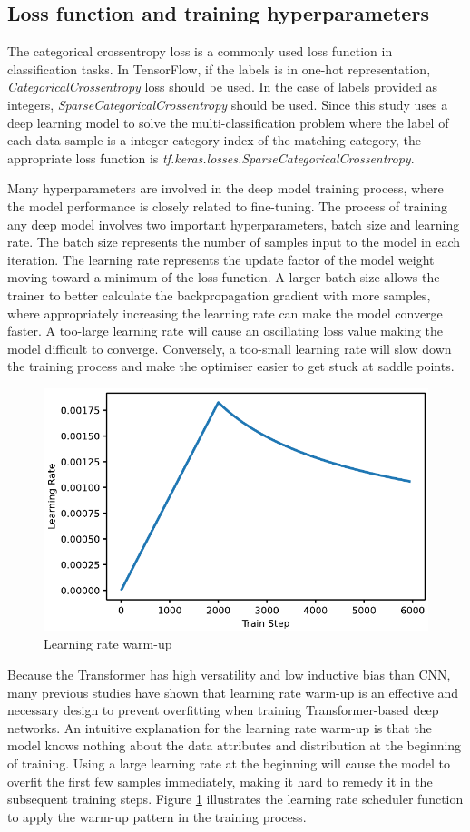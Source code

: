 \subsection{Loss function and training hyperparameters}
The categorical crossentropy loss is a commonly used loss function in classification tasks.
In TensorFlow, if the labels is in one-hot representation, \textit{CategoricalCrossentropy} loss should be used.
In the case of labels provided as integers, \textit{SparseCategoricalCrossentropy} should be used.
Since this study uses a deep learning model to solve the multi-classification problem where the label of each data sample is a integer category index of the matching category, the appropriate loss function is \textit{tf.keras.losses.SparseCategoricalCrossentropy}.

Many hyperparameters are involved in the deep model training process, where the model performance is closely related to fine-tuning.
The process of training any deep model involves two important hyperparameters, batch size and learning rate.
The batch size represents the number of samples input to the model in each iteration.
The learning rate represents the update factor of the model weight moving toward a minimum of the loss function.
A larger batch size allows the trainer to better calculate the backpropagation gradient with more samples, where appropriately increasing the learning rate can make the model converge faster.
A too-large learning rate will cause an oscillating loss value making the model difficult to converge.
Conversely, a too-small learning rate will slow down the training process and make the optimiser easier to get stuck at saddle points.

\begin{figure}
    \vspace*{-1.2em}
    \centering
    \includegraphics[width=.6\textwidth]{design/imgs/3-lr-warmup.pdf}
    \caption{Learning rate warm-up}
    \label{fig:3-lr-warmup}
\end{figure}

Because the Transformer has high versatility and low inductive bias than CNN, many previous studies have shown that learning rate warm-up is an effective and necessary design to prevent overfitting when training Transformer-based deep networks.
An intuitive explanation for the learning rate warm-up is that the model knows nothing about the data attributes and distribution at the beginning of training.
Using a large learning rate at the beginning will cause the model to overfit the first few samples immediately, making it hard to remedy it in the subsequent training steps.
Figure \ref{fig:3-lr-warmup} illustrates the learning rate scheduler function to apply the warm-up pattern in the training process.
